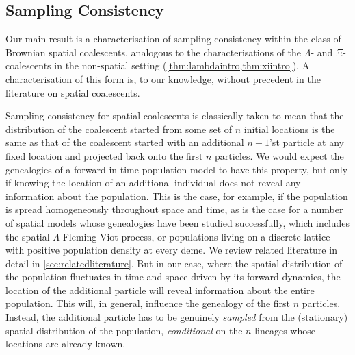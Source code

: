\documentclass[reqno,draft]{amsart}
\numberwithin{equation}{section}
\theoremstyle{plain}
\theoremstyle{remark}
\newcommand{\nunk}{\nu_{n,\smash{\vec{k}}}}
\begin{document}

\subsection{Sampling Consistency}
Our main result is a characterisation of sampling consistency within the class of Brownian spatial coalescents, analogous to the characterisations of the $\Lambda$- and $\Xi$-coalescents in the non-spatial setting (\cref{thm:lambdaintro,thm:xiintro}). A characterisation of this form is, to our knowledge, without precedent in the literature on spatial coalescents.

Sampling consistency for spatial coalescents is classically taken to mean that the distribution of the coalescent started from some set of $n$ initial locations is the same as that of the coalescent started with an additional $n+1$'st particle at any fixed location and projected back onto the first $n$ particles. We would expect the genealogies of a forward in time population model to have this property, but only if knowing the location of an additional individual does not reveal any information about the population. This is the case, for example, if the population is spread homogeneously throughout space and time, as is the case for a number of spatial models whose genealogies have been studied successfully, which includes the spatial $\Lambda$-Fleming-Viot process, or populations living on a discrete lattice with positive population density at every deme. We review related literature in detail in \cref{sec:relatedliterature}. But in our case, where the spatial distribution of the population fluctuates in time and space driven by its forward dynamics, the location of the additional particle will reveal information about the entire population. This will, in general, influence the genealogy of the first $n$ particles. Instead, the additional particle has to be genuinely \emph{sampled} from the (stationary) spatial distribution of the population, \emph{conditional} on the $n$ lineages whose locations are already known. %
\end{document}
